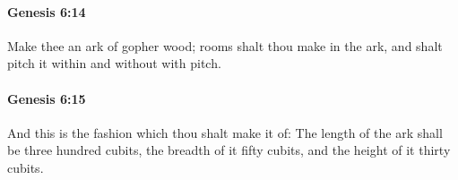		\paragraph{Genesis 6:14} %
			\label{GENESIS-6-14}

			Make thee an ark of gopher wood; rooms shalt thou make in the ark, and shalt pitch it within and without with pitch.


		\paragraph{Genesis 6:15} %
			\label{GENESIS-6-15}

			And this is the fashion which thou shalt make it of: The length of the ark shall be three hundred cubits, the breadth of it fifty cubits, and the height of it thirty cubits.


